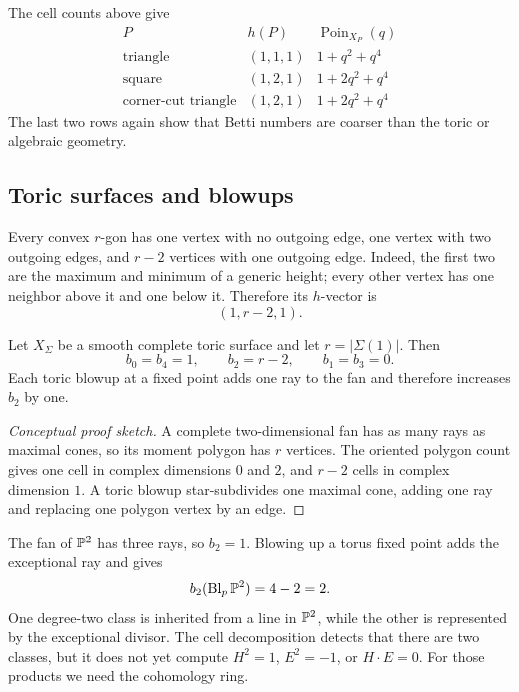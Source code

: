 \begin{example}
The cell counts above give
\[
\begin{array}{c|c|c}
P & h(P) & \operatorname{Poin}_{X_P}(q)\\
\hline
\text{triangle} & (1,1,1) & 1+q^2+q^4\\
\text{square} & (1,2,1) & 1+2q^2+q^4\\
\text{corner-cut triangle} & (1,2,1) & 1+2q^2+q^4
\end{array}
\]
The last two rows again show that Betti numbers are coarser than the
toric or algebraic geometry.
\end{example}

\subsection{Toric surfaces and blowups}

Every convex \(r\)-gon has one vertex with no outgoing edge, one vertex
with two outgoing edges, and \(r-2\) vertices with one outgoing edge.
Indeed, the first two are the maximum and minimum of a generic height;
every other vertex has one neighbor above it and one below it.
Therefore its \(h\)-vector is
\[
(1,r-2,1).
\]

\begin{corollary}
\label{cor:betti-smooth-toric-surface}
Let \(X_\Sigma\) be a smooth complete toric surface and let
\(r=|\Sigma(1)|\). Then
\[
b_0=b_4=1,
\qquad
b_2=r-2,
\qquad
b_1=b_3=0.
\]
Each toric blowup at a fixed point adds one ray to the fan and therefore
increases \(b_2\) by one.
\end{corollary}

\begin{proof}[Conceptual proof sketch]
A complete two-dimensional fan has as many rays as maximal cones, so
its moment polygon has \(r\) vertices. The oriented polygon count gives
one cell in complex dimensions \(0\) and \(2\), and \(r-2\) cells in
complex dimension \(1\). A toric blowup star-subdivides one maximal cone,
adding one ray and replacing one polygon vertex by an edge.
\end{proof}

\begin{example}
The fan of \(\mathbb{P}^2\) has three rays, so \(b_2=1\). Blowing up a torus
fixed point adds the exceptional ray and gives
\[
b_2(\operatorname{Bl}_p\mathbb{P}^2)=4-2=2.
\]
One degree-two class is inherited from a line in \(\mathbb{P}^2\), while the
other is represented by the exceptional divisor. The cell decomposition
detects that there are two classes, but it does not yet compute
\(H^2=1\), \(E^2=-1\), or \(H\cdot E=0\). For those products we need the
cohomology ring.
\end{example}

